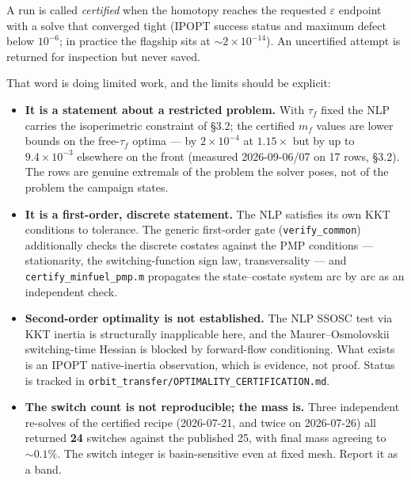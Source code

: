 \documentclass[11pt]{article}
\newcommand{\file}[1]{\texttt{#1}}
\begin{document}
A run is called \emph{certified} when the homotopy reaches the requested
$\varepsilon$ endpoint with a solve that converged tight (IPOPT success status
and maximum defect below $10^{-6}$; in practice the flagship sits at
$\sim2\times10^{-14}$). An uncertified attempt is returned for inspection but
never saved.

That word is doing limited work, and the limits should be explicit:

\begin{itemize}
\item \textbf{It is a statement about a restricted problem.} With $\tau_f$
fixed the NLP carries the isoperimetric constraint of \S3.2; the certified
$m_f$ values are lower bounds on the free-$\tau_f$ optima --- by
$2\times10^{-4}$ at $1.15\times$ but by up to $9.4\times10^{-3}$ elsewhere on
the front (measured 2026-09-06/07 on 17 rows, \S3.2). The rows are genuine extremals of the
problem the solver poses, not of the problem the campaign states.
\item \textbf{It is a first-order, discrete statement.} The NLP satisfies its
own KKT conditions to tolerance. The generic first-order gate
(\file{verify\_common}) additionally checks the discrete costates against the
PMP conditions --- stationarity, the switching-function sign law,
transversality --- and \file{certify\_minfuel\_pmp.m} propagates the
state--costate system arc by arc as an independent check.

\item \textbf{Second-order optimality is not established.} The NLP SSOSC test
via KKT inertia is structurally inapplicable here, and the
Maurer--Osmolovskii switching-time Hessian is blocked by forward-flow
conditioning. What exists is an IPOPT native-inertia observation, which is
evidence, not proof. Status is tracked in
\file{orbit\_transfer/OPTIMALITY\_CERTIFICATION.md}.

\item \textbf{The switch count is not reproducible; the mass is.} Three
independent re-solves of the certified recipe (2026-07-21, and twice on
2026-07-26) all returned \textbf{24} switches against the published 25, with
final mass agreeing to $\sim0.1\%$. The switch integer is basin-sensitive even
at fixed mesh. Report it as a band.


\end{itemize}
\end{document}
